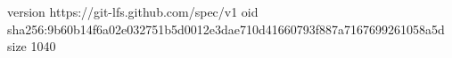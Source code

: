 version https://git-lfs.github.com/spec/v1
oid sha256:9b60b14f6a02e032751b5d0012e3dae710d41660793f887a7167699261058a5d
size 1040
